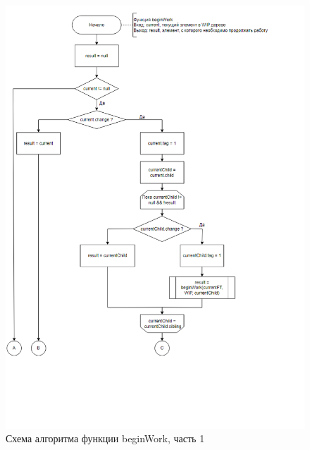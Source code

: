 \begin{figure}[h]
	\centering
	\includegraphics[width=170mm]{img/fiber-begin-work-1.png}
	\caption{Схема алгоритма функции beginWork, часть 1}
	\label{fig:fiber-begin-work-1}
\end{figure}

